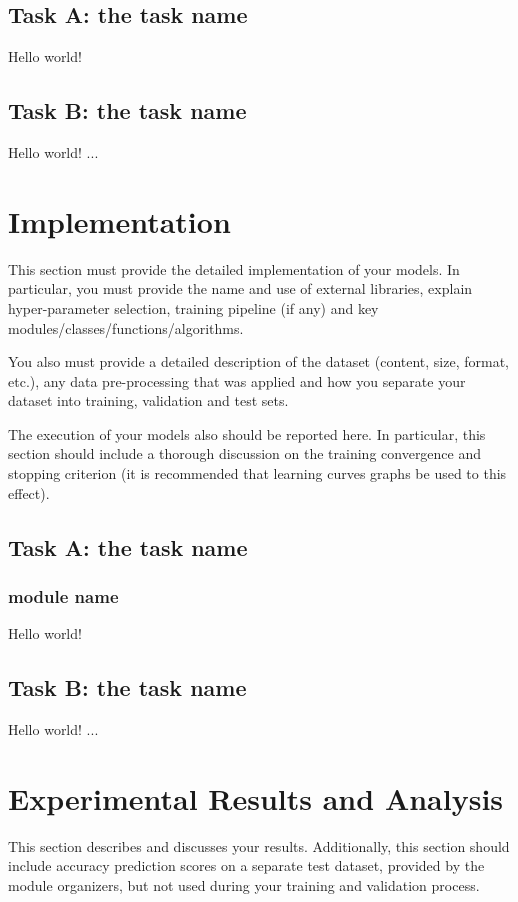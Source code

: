 \documentclass{article}
\begin{document}
    \subsection{Task A: the task name}
    \label{ssec:desc_models_A1}
    Hello world!
    \subsection{Task B: the task name}
    \label{ssec:desc_models_B}
    Hello world!
    ...
    

\section{Implementation}
\label{sec:impl}
    This section must provide the detailed implementation of your models. In particular, you must provide the name and use of external libraries, explain hyper-parameter selection, training pipeline (if any) and key modules/classes/functions/algorithms.
    
    You also must provide a detailed description of the dataset (content, size, format, etc.), any data pre-processing that was applied and how you separate your dataset into training, validation and test sets.
    
    The execution of your models also should be reported here. In particular, this section should include a thorough discussion on the training convergence and stopping criterion (it is recommended that learning curves graphs be used to this effect).

    \subsection{Task A: the task name}
    \label{ssec:imp_models_A1}
    \subsubsection{module name}
    Hello world!
    \subsection{Task B: the task name}
    \label{ssec:imp_models_B}
    Hello world! ...
    

\section{Experimental Results and Analysis}
\label{sec:results}
    This section describes and discusses your results. Additionally, this section should include accuracy prediction scores on a separate test dataset, provided by the module organizers, but not used during your training and validation process.
    
\end{document}
